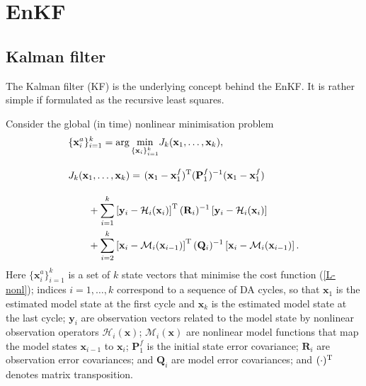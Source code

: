 \documentclass[11pt]{report}
\newcommand{\mb} {\mathbf}
\newcommand{\T}{^{\tiny \mathrm T}}
\begin{document}
\chapter{EnKF}
\label{ch:enkf}

\section{Kalman filter}

The Kalman filter (KF) is the underlying concept behind the EnKF.
It is rather simple if formulated as the recursive least squares.

Consider the global (in time) nonlinear minimisation problem
\begin{align}
  \label{min-nonl}
  &\{\mb x_i^a\}_{i=1}^k = \arg \underset{\{\mb x_i\}_{i = 1}^k}\min J_k(\mb x_1, \dots, \mb x_k),\\
  \nonumber
  &J_k(\mb x_1, \dots, \mb x_k)  = \left . (\mb x_1 - \mb x_1^f)\T (\mb P_1^f)^{-1} (\mb x_1 - \mb x_1^f) 
  \vphantom{\sum_{i = 2}^{k}}
  \right . \\
  \nonumber
  & \qquad + \sum_{i = 1}^k \left [ \mb y_i - \mathcal H_i(\mb x_i) \right ] \T (\mb R_i)^{-1} \left [ \mb y_i - \mathcal H_i(\mb x_i) \right ] \\ 
  & \qquad + \sum_{i = 2}^k \left [ \mb x_i - \mathcal M_i(\mb x_{i-1}) \right ]\T (\mb Q_i)^{-1} \left [ \mb x_i - \mathcal M_i(\mb x_{i-1}) \right ].
  \label{L-nonl}
\end{align}
Here $\{\mb x_i^a\}_{i=1}^k$ is a set of $k$ state vectors that minimise the cost function (\ref{L-nonl}); indices $i = 1,\dots,k$ correspond to a sequence of DA cycles, so that $\mb x_1$ is the estimated model state at the first cycle and $\mb x_k$ is the estimated model state at the last cycle; $\mb y_i$ are observation vectors related to the model state by nonlinear observation operators $\mathcal H_i(\mb x)$; $\mathcal M_i(\mb x)$ are nonlinear model functions that map the model states $\mb x_{i - 1}$ to $\mb x_i$; $\mb P_1^f$ is the initial state error covariance; $\mb R_i$ are observation error covariances; and $\mb Q_i$ are model error covariances; and $(\cdot)\T$ denotes matrix transposition.
\end{document}
